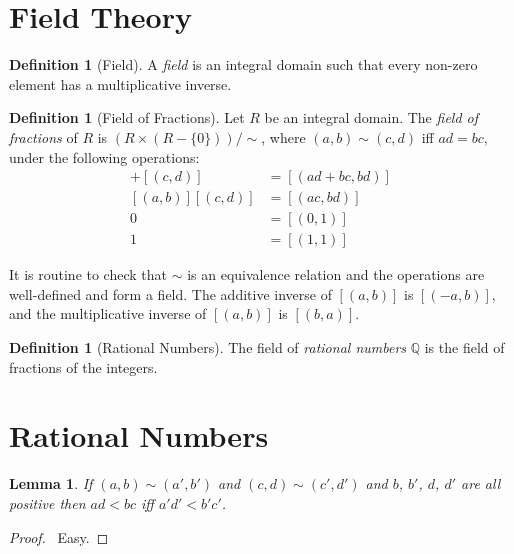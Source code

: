 \documentclass{article}
\newtheorem{lemma}[axiom]{Lemma}
\theoremstyle{definition}
\newtheorem{definition}[axiom]{Definition}
\begin{document}
    \section{Field Theory}

    \begin{definition}[Field]
        A \emph{field} is an integral domain such that every non-zero element has a multiplicative inverse.
    \end{definition}

    \begin{definition}[Field of Fractions]
        Let $R$ be an integral domain. The \emph{field of fractions} of $R$ is $(R \times (R - \{ 0 \})) / \sim$,
        where $(a,b) \sim (c,d)$ iff $ad = bc$, under the following operations:
        \begin{align*}
            [(a,b)] + [(c,d)] & = [(ad+bc,bd)] \\
            [(a,b)][(c,d)] & = [(ac,bd)] \\
            0 & = [(0,1)] \\
            1 & = [(1,1)]
        \end{align*}

        It is routine to check that $\sim$ is an equivalence relation and the operations are well-defined
        and form a field. The additive inverse of $[(a,b)]$ is $[(-a,b)]$, and the multiplicative inverse
        of $[(a,b)]$ is $[(b,a)]$.
    \end{definition}

    \begin{definition}[Rational Numbers]
        The field of \emph{rational numbers} $\mathbb{Q}$ is the field of fractions of the integers.
    \end{definition}



    \section{Rational Numbers}

    \begin{lemma}
        If $(a,b) \sim (a',b')$ and $(c,d) \sim (c',d')$ and $b$, $b'$, $d$, $d'$
        are all positive then $ad<bc$ iff $a'd'<b'c'$.
    \end{lemma}

    \begin{proof}
        \pf\ Easy.
    \end{proof}
\end{document}
